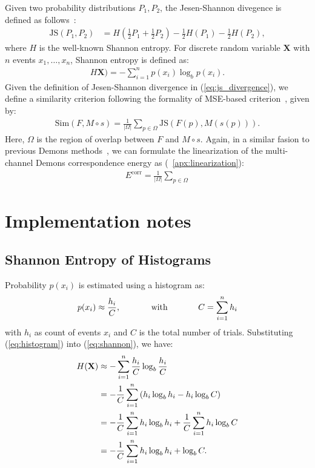 \documentclass[preprint,review,12pt]{elsarticle}
\newcommand{\MovingGroup}{M}
\newcommand{\FixedGroup}{F}
\newcommand{\Prob}{P}										%
\newcommand{\Entropy}{H}
\newcommand{\JSD}{\text{JS}}						%
\newcommand{\SimFunc}{\text{Sim}}
\newcommand{\Ecorr}{E^{\text{corr}}}		%
\begin{document}
Given two probability distributions $\Prob_1,\Prob_2$, the Jesen-Shannon divegence is defined as follows~\cite{wang_vemuri_js_divergence}:
\begin{align}
	\JSD(\Prob_1,\Prob_2) &= \Entropy\left(\frac{1}{2}\Prob_1+\frac{1}{2}\Prob_2\right)-\frac{1}{2}\Entropy(\Prob_1)-\frac{1}{2}\Entropy(\Prob_2),
	\label{eq:js_divergence}
\end{align}
where $\Entropy$ is the well-known Shannon entropy. For discrete random variable $\mathbf{X}$ with $n$ events ${x_1,\ldots, x_n}$, Shannon entropy is defined as:
\begin{align}
\Entropy\mathbf{X})=-\sum_{i=1}^n p(x_i) \log_b p(x_i).
\label{eq:shannon}
\end{align}
Given the definition of Jesen-Shannon divergence in (\ref{eq:js_divergence}), we define a similarity criterion following the formality of MSE-based criterion~\cite{Vercauteren2009S61}, given by:
\begin{align}
\SimFunc(\FixedGroup,\MovingGroup\circ s)=\frac{1}{|\Omega|} \sum_{p \in \Omega} \JSD\left(\FixedGroup(p),\MovingGroup(s(p))\right).
\label{eq:js_similarity}
\end{align}
Here, $\Omega$ is the region of overlap between $\FixedGroup$ and $\MovingGroup\circ s$.
Again, in a similar fasion to previous Demons methods~\cite{Vercauteren2009S61,peyrat_multichannel_demons}, we can formulate the linearization of the multi-channel Demons correspondence energy as (~\ref{apx:linearization}):
\begin{align}
	\Ecorr = \frac{1}{|\Omega|} \sum_{p \in \Omega}
	\label{eq:linearization}
\end{align}

\appendix

\section{Implementation notes}

\subsection{Shannon Entropy of Histograms}

Probability $p(x_i)$ is estimated using a histogram as:
\begin{align}
p(x_i)\approx\frac{h_i}{C}, \hspace{.5in} \text{with} \hspace{.5in} C=\sum_{i=1}^{n} h_i
\label{eq:histogram}
\end{align}
with $h_i$ as count of events $x_i$ and $C$ is the total number of trials. Substituting (\ref{eq:histogram}) into (\ref{eq:shannon}), we have:
\begin{align}
	H(\mathbf{X})&\approx - \sum_{i=1}^n \frac{h_i}{C} \log_b \frac{h_i}{C} \notag\\
	&=-\frac{1}{C} \sum_{i=1}^n \left( h_i \log_b h_i - h_i \log_b C \right) \notag \\
	&=-\frac{1}{C} \sum_{i=1}^n h_i \log_b h_i + \frac{1}{C}\sum_{i=1}^n h_i \log_b C \notag \\
	&= -\frac{1}{C} \sum_{i=1}^n h_i \log_b h_i + \log_b C .
\end{align}
\end{document}
